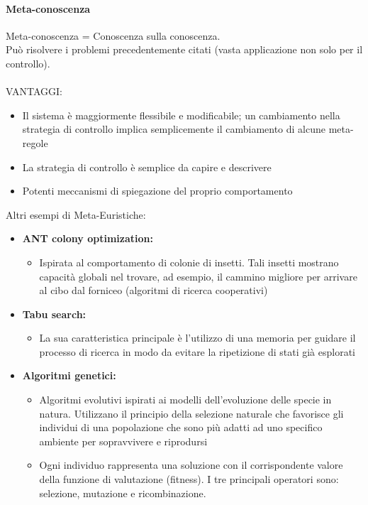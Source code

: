 \documentclass[../main.tex]{subfiles}
\begin{document}
	\paragraph{Meta-conoscenza}
	Meta-conoscenza = Conoscenza sulla conoscenza.\\
	Può risolvere i problemi precedentemente citati (vasta applicazione non solo per il controllo).\\\\
	VANTAGGI:
	\begin{itemize}
		\item Il sistema è maggiormente flessibile e modificabile; un cambiamento nella strategia di controllo implica semplicemente il cambiamento di alcune meta-regole
		\item La strategia di controllo è semplice da capire e descrivere
		\item Potenti meccanismi di spiegazione del proprio comportamento
	\end{itemize}
	Altri esempi di Meta-Euristiche:
	\begin{itemize}
		\item \textbf{ANT colony optimization:}
		\begin{itemize}
			\item Ispirata al comportamento di colonie di insetti. Tali insetti mostrano capacità globali nel trovare, ad esempio, il cammino migliore per arrivare al cibo dal forniceo (algoritmi di ricerca cooperativi)
		\end{itemize}
		\item \textbf{Tabu search:}
		\begin{itemize}
			\item La sua caratteristica principale è l’utilizzo di una memoria per guidare il processo di ricerca in modo da evitare la ripetizione di stati già esplorati
		\end{itemize}
		\item \textbf{Algoritmi genetici:}
		\begin{itemize}
			\item Algoritmi evolutivi ispirati ai modelli dell’evoluzione delle specie in natura. Utilizzano il principio della selezione naturale che favorisce gli individui di una popolazione che sono più adatti ad uno specifico ambiente per sopravvivere e riprodursi
			\item Ogni individuo rappresenta una soluzione con il corrispondente valore della funzione di valutazione (fitness). I tre principali operatori sono: selezione, mutazione e ricombinazione.
		\end{itemize}
	\end{itemize}
\end{document}
